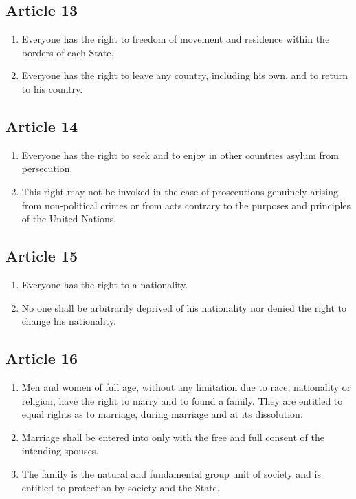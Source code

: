 \documentclass[
  ngerman,
  american,
  titlepage,
  openright,
  DIV=calc,
  toc=listof,
  listof=nochaptergap]{scrbook}
\begin{document}
\subsection{Article 13}\label{article-13-1}

\begin{enumerate}
\def\labelenumi{\arabic{enumi}.}
\item
  Everyone has the right to freedom of movement and residence within the
  borders of each State.
\item
  Everyone has the right to leave any country, including his own, and to
  return to his country.
\end{enumerate}

\subsection{Article 14}\label{article-14-1}

\begin{enumerate}
\def\labelenumi{\arabic{enumi}.}
\item
  Everyone has the right to seek and to enjoy in other countries asylum
  from persecution.
\item
  This right may not be invoked in the case of prosecutions genuinely
  arising from non-political crimes or from acts contrary to the
  purposes and principles of the United Nations.
\end{enumerate}

\subsection{Article 15}\label{article-15-1}

\begin{enumerate}
\def\labelenumi{\arabic{enumi}.}
\item
  Everyone has the right to a nationality.
\item
  No one shall be arbitrarily deprived of his nationality nor denied the
  right to change his nationality.
\end{enumerate}

\subsection{Article 16}\label{article-16-1}

\begin{enumerate}
\def\labelenumi{\arabic{enumi}.}
\item
  Men and women of full age, without any limitation due to race,
  nationality or religion, have the right to marry and to found a
  family. They are entitled to equal rights as to marriage, during
  marriage and at its dissolution.
\item
  Marriage shall be entered into only with the free and full consent of
  the intending spouses.
\item
  The family is the natural and fundamental group unit of society and is
  entitled to protection by society and the State.
\end{enumerate}
\end{document}
